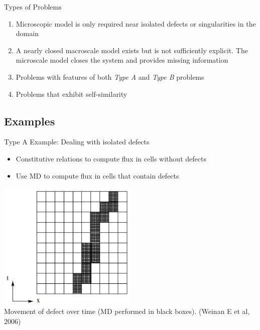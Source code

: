 \documentclass{beamer}
\begin{document}
	\begin{frame}{Types of Problems}
		\begin{enumerate}[leftmargin=1.75cm]
			\item[\textbf{Type A:}] Microscopic model is only required near isolated defects or singularities in the domain
			\vspace{1em}
			\item[\textbf{Type B:}] A nearly closed macroscale model exists but is not sufficiently explicit. The microscale model closes the system and provides missing information
			\vspace{1em}
			\item[\textbf{Type C:}] Problems with features of both \emph{Type A} and \emph{Type B} problems
			\vspace{1em}
			\item[\textbf{Type D:}] Problems that exhibit self-similarity
		\end{enumerate}
	\end{frame}
	
	\subsection{Examples}
	\begin{frame}[t]{Type A Example: Dealing with isolated defects}
		\begin{itemize}
			\item  Constitutive relations to compute flux in cells without defects\vspace{1em}
			\item  Use MD to compute flux in cells that contain defects
		\end{itemize}
		\begin{center}
			\includegraphics[width=0.5\textwidth]{typeA.png}
			\\\tiny Movement of defect over time (MD performed in black boxes). (Weinan E et al, 2006)
		\end{center}
	\end{frame}
	
\end{document}
